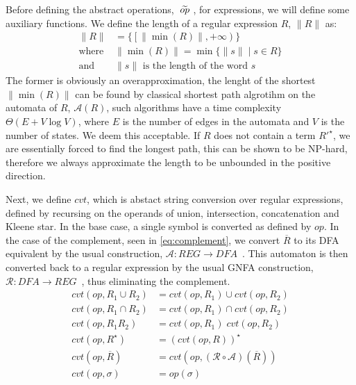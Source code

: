 Before defining the abstract operations, $\;\widetilde{op}\;$, for expressions, we will define some auxiliary functions.
We define the length of a regular expression $R$, $\|R\|$ as:
\begin{align}\label{eq:r1}
    \|R\| & = \{ \left[ \|\min(R)\|, +\infty \right) \} \\
    \text{where } & \|\min(R)\| = \min\{ \|s\| \mid s \in R \} \\ \label{eq:r2}
    \text{and } & \|s\| \text{ is the length of the word $s$}
\end{align}
The former is obviously an overapproximation, the lenght of the shortest $\|\min(R)\|$ can be found by classical shortest path algrotihm on the automata of $R$, $\mathcal{A}(R)$, such algorithms have a time complexity $\Theta(E + V \log V)$, where $E$ is the number of edges in the automata and $V$ is the number of states.
We deem this acceptable.
If $R$ does not contain a term $R'^\star$, we are essentially forced to find the longest path, this can be shown to be NP-hard, therefore we always approximate the length to be unbounded in the positive direction.

Next, we define $cvt$, which is abstact string conversion over regular expressions, defined by recursing on the operands of union, intersection, concatenation and Kleene star.
In the base case, a single symbol is converted as defined by $op$.
In the case of the complement, seen in \autoref{eq:complement}, we convert $\overline{R}$ to its DFA equivalent by the usual construction, $\mathcal{A}:REG\rightarrow DFA$~\cite{sipserbook}.
This automaton is then converted back to a regular expression by the usual GNFA construction, $\mathcal{R}: DFA\rightarrow REG$~\cite{sipserbook}, thus eliminating the complement.
\begin{align}
    cvt(op, R_1 \cup R_2) &= cvt(op, R_1) \cup cvt(op, R_2) \\
    cvt(op, R_1 \cap R_2) &= cvt(op, R_1) \cap cvt(op, R_2) \\
    cvt(op, R_1R_2) &= cvt(op, R_1) \; cvt(op, R_2) \\
    cvt(op, R^\star) &= (cvt(op, R))^\star \\
    cvt(op, \overline{R}) &= cvt(op, (\mathcal{R} \circ \mathcal{A}) (\overline{R})) \label{eq:complement} \\
    cvt(op, \sigma) &= op(\sigma)
\end{align}

